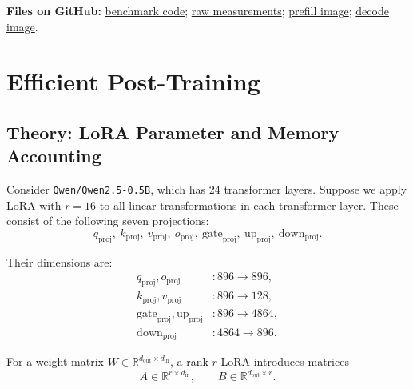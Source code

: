 {\textbf{Files on GitHub:} \href{https://github.com/SirNosh/LM-Agents-HW/blob/main/q3_benchmark.py}{benchmark code}; \href{https://github.com/SirNosh/LM-Agents-HW/blob/main/results/q1_fp8_20260924_215129/raw_measurements.csv}{raw measurements}; \href{https://github.com/SirNosh/LM-Agents-HW/blob/main/results/q1_fp8_20260924_215129/prefill_throughput.png}{prefill image}; \href{https://github.com/SirNosh/LM-Agents-HW/blob/main/results/q1_fp8_20260924_215129/decode_throughput.png}{decode image}.}



\section{Efficient Post-Training}

\subsection{Theory: LoRA Parameter and Memory Accounting}

Consider \texttt{Qwen/Qwen2.5-0.5B}, which has 24 transformer layers.
Suppose we apply LoRA \citep{hu2021lora} with $r=16$ to all linear transformations in each transformer
layer. These consist of the following seven projections:
\[
q_{\text{proj}},\ k_{\text{proj}},\ v_{\text{proj}},\ o_{\text{proj}},\
\text{gate}_{\text{proj}},\ \text{up}_{\text{proj}},\ \text{down}_{\text{proj}}.
\]

Their dimensions are:
\[
\begin{aligned}
q_{\text{proj}}, o_{\text{proj}} &: 896 \rightarrow 896,\\
k_{\text{proj}}, v_{\text{proj}} &: 896 \rightarrow 128,\\
\text{gate}_{\text{proj}}, \text{up}_{\text{proj}} &: 896 \rightarrow 4864,\\
\text{down}_{\text{proj}} &: 4864 \rightarrow 896.
\end{aligned}
\]

For a weight matrix
$W\in\mathbb{R}^{d_{\text{out}}\times d_{\text{in}}}$,
a rank-$r$ LoRA introduces matrices
\[
A\in\mathbb{R}^{r\times d_{\text{in}}},\qquad
B\in\mathbb{R}^{d_{\text{out}}\times r}.
\]

